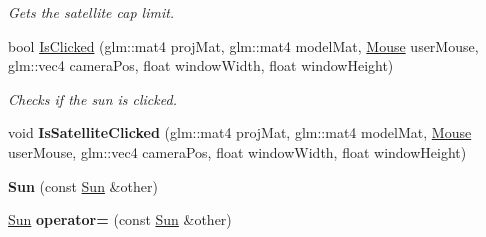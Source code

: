 \begin{DoxyCompactItemize}
\begin{DoxyCompactList}\small\item\em Gets the satellite cap limit. \end{DoxyCompactList}\item 
bool \hyperlink{class_sun_a07ac47d10ff08b43c74de2b704d0ba5a}{Is\-Clicked} (glm\-::mat4 proj\-Mat, glm\-::mat4 model\-Mat, \hyperlink{class_mouse}{Mouse} user\-Mouse, glm\-::vec4 camera\-Pos, float window\-Width, float window\-Height)
\begin{DoxyCompactList}\small\item\em Checks if the sun is clicked. \end{DoxyCompactList}\item 
\hypertarget{class_sun_a5808caa1b90e6a743df2df5ecb9f9850}{void {\bfseries Is\-Satellite\-Clicked} (glm\-::mat4 proj\-Mat, glm\-::mat4 model\-Mat, \hyperlink{class_mouse}{Mouse} user\-Mouse, glm\-::vec4 camera\-Pos, float window\-Width, float window\-Height)}\label{class_sun_a5808caa1b90e6a743df2df5ecb9f9850}

\item 
\hypertarget{class_sun_a3f7d32a340ac92de0b49b1a804159431}{{\bfseries Sun} (const \hyperlink{class_sun}{Sun} \&other)}\label{class_sun_a3f7d32a340ac92de0b49b1a804159431}

\item 
\hypertarget{class_sun_a511e97ba6dbf11d67f2c7e611626e312}{\hyperlink{class_sun}{Sun} {\bfseries operator=} (const \hyperlink{class_sun}{Sun} \&other)}\label{class_sun_a511e97ba6dbf11d67f2c7e611626e312}

\end{DoxyCompactItemize}
